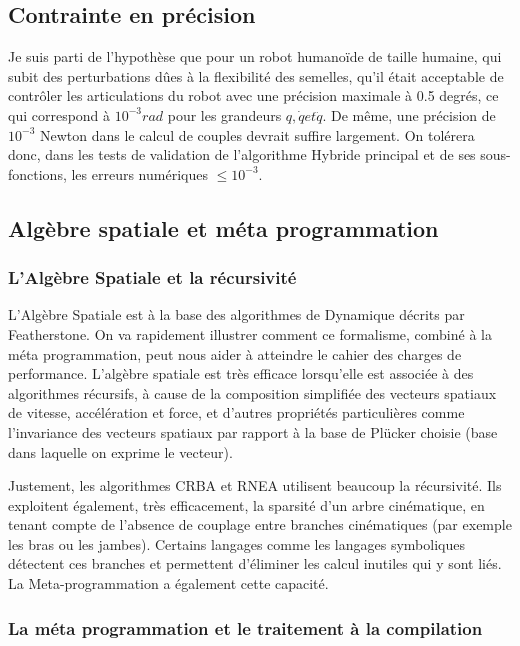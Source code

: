 \documentclass{report}
\begin{document}
\subsection{Contrainte en précision}

Je suis parti de l'hypothèse que pour un robot humanoïde de taille humaine, qui subit des perturbations dûes à la flexibilité des semelles, qu'il était acceptable de contrôler les articulations du robot avec une précision maximale à 0.5 degrés, ce qui correspond à $10^{-3} rad$ pour les grandeurs $q, \dot{q} et \ddot{q}$. De même, une précision de $10^{-3}$ Newton dans le calcul de couples devrait suffire largement. On tolérera donc, dans les tests de validation de l'algorithme Hybride principal et de ses sous-fonctions, les erreurs numériques $\leqslant 10^{-3}$.


\subsection{Algèbre spatiale et méta programmation}

\subsubsection*{L'Algèbre Spatiale et la récursivité}

L'Algèbre Spatiale est à la base des algorithmes de Dynamique décrits par Featherstone. On va rapidement illustrer comment ce formalisme, combiné à la méta programmation, peut nous aider à atteindre le cahier des charges de performance. L'algèbre spatiale est très efficace lorsqu'elle est associée à des algorithmes récursifs, à cause de la composition simplifiée des vecteurs spatiaux de vitesse, accélération et force, et d'autres propriétés particulières comme l'invariance des vecteurs spatiaux par rapport à la base de Plücker choisie (base dans laquelle on exprime le vecteur).

Justement, les algorithmes CRBA et RNEA utilisent beaucoup la récursivité. Ils exploitent également, très efficacement, la sparsité d'un arbre cinématique, en tenant compte de l'absence de couplage entre branches cinématiques (par exemple les bras ou les jambes). Certains langages comme les langages symboliques détectent ces branches et permettent d'éliminer les calcul inutiles qui y sont liés. La Meta-programmation a également cette capacité.

\subsubsection*{La méta programmation et le traitement à la compilation}
\end{document}
